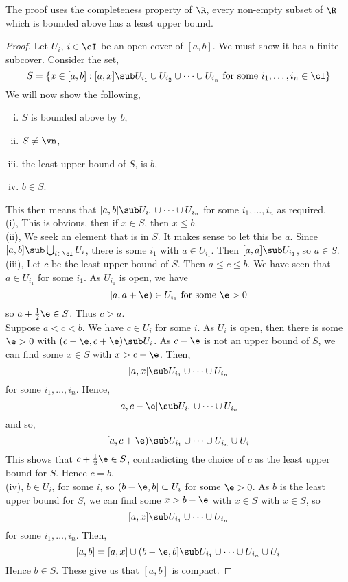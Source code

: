 \noindent
The proof uses the completeness property of $\R$, every non-empty subset of $\R$ which is bounded above has a least upper bound.

\begin{proof}
  Let $U_i$, $i \in \cI$ be an open cover of $[a, b]$. We must show it has a finite subcover. Consider the set,
  $$ S = \{x\in [a, b] : [a, x] \sub U_{i_1} \cup U_{i_2} \cup \dots \cup U_{i_n} \text{ for some } i_1, \dots, i_n \in \cI\} $$
  We will now show the following,
  \begin{enumerate}[(i)]
    \item $S$ is bounded above by $b$,
    \item $S \ne \vn$,
    \item the least upper bound of $S$, is $b$,
    \item $b \in S$.
  \end{enumerate}
  \noindent
  This then means that $[a, b] \sub U_{i_1}\cup \dots \cup U_{i_n}$ for some $i_1, \dots, i_n$ as required.\\

  \noindent
  (i), This is obvious, then if $x \in S$, then $x \le b$.\\

  \noindent
  (ii), We seek an element that is in $S$. It makes sense to let this be $a$. Since $[a, b] \sub \bigcup_{i \in \cI} U_i$, there is some $i_1$ with $a \in U_{i_1}$. Then $[a, a] \sub U_{i_1}$, so $a \in S$.\\

  \noindent
  (iii), Let $c$ be the least upper bound of $S$. Then $a \le c \le b$. We have seen that $a \in U_{i_1}$ for some $i_1$. As $U_{i_1}$ is open, we have
  $$ [a, a+\e ) \in U_{i_1} \text{ for some }\e > 0 $$
  so $a + \frac{1}{2}\e \in S$. Thus $c > a$.\\

  \noindent
  Suppose $a < c < b$. We have $c \in U_i$ for some $i$. As $U_i$ is open, then there is some $\e > 0$ with $(c - \e, c + \e)\sub U_i$. As $c - \e$ is not an upper bound of $S$, we can find some $x \in S$ with $x > c - \e$. Then,
  $$ [a, x] \sub U_{i_1}\cup \dots \cup U_{i_n} $$
  for some $i_1, \dots, i_n$. Hence,
  $$ [a, c - \e] \sub U_{i_1} \cup \dots \cup U_{i_n} $$
  and so,
  $$ [a, c + \e) \sub U_{i_1} \cup \dots \cup U_{i_n}\cup U_i $$
  This shows that $c + \frac{1}{2}\e \in S$, contradicting the choice of $c$ as the least upper bound for $S$. Hence $c = b$.\\

  \noindent
  (iv), $b \in U_i$, for some $i$, so $(b - \e, b] \subset U_i$ for some $\e > 0$. As $b$ is the least upper bound for $S$, we can find some $x > b - \e$ with $x \in S$ with $x \in S$, so
  $$ [a, x] \sub U_{i_1}\cup \dots \cup U_{i_n} $$
  for some $i_1,\dots, i_n$. Then,
  $$ [a, b] = [a, x] \cup (b - \e, b] \sub U_{i_1}\cup \dots \cup U_{i_n} \cup U_i $$
  Hence $b \in S$. These give us that $[a, b]$ is compact.
\end{proof}


